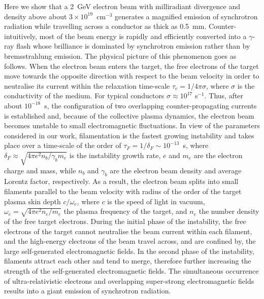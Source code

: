 \documentclass[fleqn,11pt]{wlscirep}
\begin{document}
Here we show that a 2~GeV electron beam with milliradiant divergence and density above about $3\times10^{19}$~cm$^{-3}$ generates a magnified emission of synchrotron radiation while travelling across a conductor as thick as 0.5~mm.
Counter-intuitively, most of the beam energy is rapidly and efficiently converted into a $\gamma$-ray flash whose brilliance is dominated by synchrotron emission rather than by bremsstrahlung emission. 
The physical picture of this phenomenon goes as follows. 
When the electron beam enters the target, the free electrons of the target move towards the opposite direction with respect to the beam velocity in order to neutralise its current within the relaxation time-scale $\tau_e=1/4\pi\sigma$, where $\sigma$ is the conductivity of the medium\cite{2001PhPl....8.1441F}. 
For typical conductors\cite{047141526X} $\sigma \approx 10^{17}$ s$^{-1}$. Thus, after about $10^{-18}$~s, the configuration of two overlapping counter-propagating currents is established and, because of the collective plasma dynamics, the electron beam becomes unstable to small electromagnetic fluctuations\cite{PhysRevLett.2.83}. 
In view of the parameters considered in our work, filamentation is the fastest growing instability 
and takes place over a time-scale of the order of $\tau_F=1/\delta_F\sim10^{-13}$~s, where $\delta_F\approx\sqrt{4\pi e^2n_b/\gamma_bm_e}$ is the instability growth rate, $e$ and $m_e$ are the electron charge and mass, while $n_b$ and $\gamma_b$ are the electron beam density and average Lorentz factor, respectively\cite{MillerChargedBeams}. 
As a result, the electron beam splits into small filaments parallel to the beam velocity with radius of the order of the target plasma skin depth $c/\omega_e$, where $c$ is the speed of light in vacuum, $\omega_e=\sqrt{4\pi e^2n_e/m_e}$ the plasma frequency of the target, and $n_e$ the number density of the free target electrons\cite{PhysRev.137.A1083}. 
During the initial phase of the instability, the free electrons of the target cannot neutralise the beam current within each filament, and the high-energy electrons of the beam travel across, and are confined by, the large self-generated electromagnetic fields\cite{PhysRevLett.96.105008}.  
In the second phase of the instability, filaments attract each other and tend to merge\cite{PhysRevLett.31.1390,AW2}, therefore further increasing the strength of the self-generated electromagnetic fields. The simultaneous occurrence of ultra-relativistic electrons and overlapping super-strong electromagnetic fields results into a giant emission of synchrotron radiation. 
\end{document}
